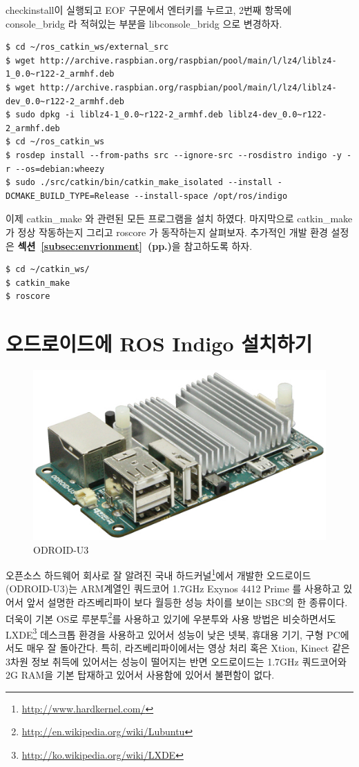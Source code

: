 checkinstall이 실행되고 EOF 구문에서 엔터키를 누르고, 2번째 항목에 console\_bridg 라 적혀있는 부분을 libconsole\_bridg 으로 변경하자.

\begin{lstlisting}[language=ROS]
$ cd ~/ros_catkin_ws/external_src
$ wget http://archive.raspbian.org/raspbian/pool/main/l/lz4/liblz4-1_0.0~r122-2_armhf.deb
$ wget http://archive.raspbian.org/raspbian/pool/main/l/lz4/liblz4-dev_0.0~r122-2_armhf.deb
$ sudo dpkg -i liblz4-1_0.0~r122-2_armhf.deb liblz4-dev_0.0~r122-2_armhf.deb
$ cd ~/ros_catkin_ws
$ rosdep install --from-paths src --ignore-src --rosdistro indigo -y -r --os=debian:wheezy
$ sudo ./src/catkin/bin/catkin_make_isolated --install -DCMAKE_BUILD_TYPE=Release --install-space /opt/ros/indigo
\end{lstlisting}

이제 catkin\_make 와 관련된 모든 프로그램을 설치 하였다. 마지막으로 catkin\_make 가 정상 작동하는지 그리고 roscore 가 동작하는지 살펴보자. 추가적인 개발 환경 설정은 \textbf{섹션~\ref{subsec:envrionment}~(pp.\pageref{subsec:envrionment})}을 참고하도록 하자.

\begin{lstlisting}[language=ROS]
$ cd ~/catkin_ws/
$ catkin_make
$ roscore
\end{lstlisting}

\newpage
\section{오드로이드에 ROS Indigo 설치하기}

\begin{figure}[h]
\centering\includegraphics[width=0.45\columnwidth]{pictures/chapter3/odroid.jpg}
\caption{ODROID-U3}
\end{figure}

오픈소스 하드웨어 회사로 잘 알려진 국내 하드커널\footnote{\url{http://www.hardkernel.com/}}에서 개발한 오드로이드(ODROID-U3)는 ARM계열인 쿼드코어 1.7GHz Exynos 4412 Prime 를 사용하고 있어서 앞서 설명한 라즈베리파이 보다 월등한 성능 차이를 보이는 SBC의 한 종류이다. 더욱이 기본 OS로 루분투\footnote{\url{http://en.wikipedia.org/wiki/Lubuntu}}를 사용하고 있기에 우분투와 사용 방법은 비슷하면서도 LXDE\footnote{\url{http://ko.wikipedia.org/wiki/LXDE}} 데스크톱 환경을 사용하고 있어서 성능이 낮은 넷북, 휴대용 기기, 구형 PC에서도 매우 잘 돌아간다. 특히, 라즈베리파이에서는 영상 처리 혹은 Xtion, Kinect 같은 3차원 정보 취득에 있어서는 성능이 떨어지는 반면 오드로이드는 1.7GHz 쿼드코어와 2G RAM을 기본 탑재하고 있어서 사용함에 있어서 불편함이 없다.

